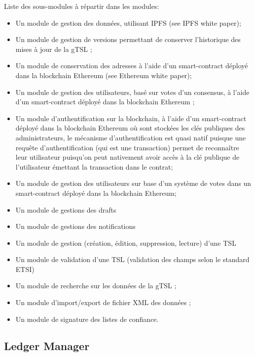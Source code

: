 \documentclass{tnreport}
\begin{document}
Liste des sous-modules à répartir dans les modules:
\begin{itemize}
	\item Un module de gestion des données, utilisant IPFS (see IPFS white paper);
	\item Un module de gestion de versions permettant de conserver l’historique des mises à jour de la gTSL ;
	\item Un module de conservation des adresses à l’aide d’un smart-contract déployé dans la blockchain Ethereum (see Ethereum white paper);
	\item Un module de gestion des utilisateurs, basé sur votes d’un consensus, à l’aide d’un smart-contract déployé dans la blockchain Ethereum ;
	
	\item Un module d'authentification sur la blockchain, à l’aide d’un smart-contract déployé dans la blockchain Ethereum où sont stockées les clés publiques des administrateurs, le mécanisme d'authentification est quasi natif puisque une requête d'authentification (qui est une transaction) permet de reconnaître leur utilisateur puisqu'on peut nativement avoir accès à la clé publique de l'utilisateur émettant la transaction dans le contrat;
	\item Un module de gestion des utilisateurs sur base d'un système de votes dans un smart-contract déployé dans la blockchain Ethereum;
	
	\item Un module de gestions des drafts
	
	\item Un module de gestions des notifications
	
	\item Un module de gestion (création, édition, suppression, lecture) d'une TSL
	\item Un module de validation d'une TSL (validation des champs selon le standard ETSI)
	\item Un module de recherche sur les données de la gTSL ;
	\item Un module d’import/export de fichier XML des données ;
	\item Un module de signature des listes de confiance.
\end{itemize}

\subsection{Ledger Manager}
\label{sec:realisation-ledger}
\end{document}
